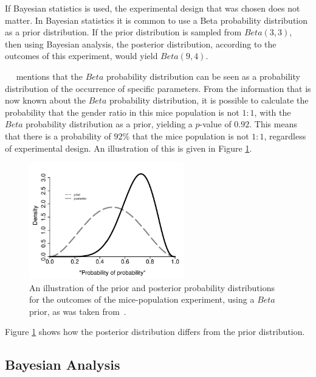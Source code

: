 If Bayesian statistics is used, the experimental design that was chosen does not matter. In Bayesian statistics it is common to use a Beta probability distribution as a prior distribution. If the prior distribution is sampled from $Beta(3,3)$, then using Bayesian analysis, the posterior distribution, according to the outcomes of this experiment, would yield $Beta(9,4)$.

~\citeauthor{ref:hackenberger:2019}~\cite{ref:hackenberger:2019} mentions that the $Beta$ probability distribution can be seen as a probability distribution of the occurrence of specific parameters. From the information that is now known about the $Beta$ probability distribution, it is possible to calculate the probability that the gender ratio in this mice population is not $1:1$, with the $Beta$ probability distribution as a prior, yielding a $p$-value of $0.92$. This means that there is a probability of $92\%$ that the mice population is not $1:1$, regardless of experimental design. An illustration of this is given in Figure \ref{fig:probability:bayesian_statistics:mouse_distributions}.

\begin{figure}[htbp]
      \centering
      \includegraphics[width=0.6\textwidth]{images/mouse_experiment_distributions.pdf}
      \caption{An illustration of the prior and posterior probability distributions for the outcomes of the mice-population experiment, using a $Beta$ prior, as was taken from~\cite{ref:hackenberger:2019}.}
      \label{fig:probability:bayesian_statistics:mouse_distributions}
\end{figure}

Figure \ref{fig:probability:bayesian_statistics:mouse_distributions} shows how the posterior distribution differs from the prior distribution.

\subsection{Bayesian Analysis}
\label{sec:probability:bayesian_statistics:bayesian_analysis}


